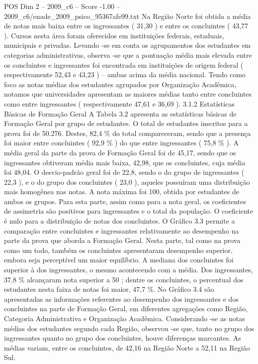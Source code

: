 \begin{textsample}{POS Dim 2 – 2009\_c6 – Score -1.00 – 2009\_c6/enade\_2009\_psico\_95367afe99.txt}
Na Região Norte foi obtida a média de notas mais baixa entre os ingressantes ( 31,30 ) e entre os concluintes ( 43,77 ).
Cursos nesta área foram oferecidos em instituições federais, estaduais, municipais e privadas.
Levando -se em conta os agrupamentos dos estudantes em categorias administrativas, observa -se que a pontuação média mais elevada entre os concluintes e ingressantes foi encontrada em instituições de origem federal ( respectivamente 52,43 e 43,23 ) – ambas acima da média nacional.
Tendo como foco as notas médias dos estudantes agrupados por Organização Acadêmica, notamos que universidades apresentam as maiores médias tanto entre concluintes como entre ingressantes ( respectivamente 47,61 e 36,69 ). 3.1.2 Estatísticas Básicas de Formação Geral A Tabela 3.2 apresenta as estatísticas básicas de Formação Geral por grupo de estudantes.
O total de estudantes inscritos para a prova foi de 50.276.
Destes, 82,4 \% do total compareceram, sendo que a presença foi maior entre concluintes ( 92,9 \% ) do que entre ingressantes ( 75,8 \% ).
A média geral da parte da prova de Formação Geral foi de 45,17, sendo que os ingressantes obtiveram média mais baixa, 42,98, que os concluintes, cuja média foi 48,04.
O desvio-padrão geral foi de 22,8, sendo o do grupo de ingressantes ( 22,3 ), e o do grupo dos concluintes ( 23,0 ), aqueles possuíram uma distribuição mais homogênea nas notas.
A nota máxima foi 100, obtida por estudantes de ambos os grupos.
Para esta parte, assim como para a nota geral, os coeficientes de assimetria são positivos para ingressantes e o total da população.
O coeficiente é nulo para a distribuição de notas dos concluintes.
O Gráfico 3.3 permite a comparação entre concluintes e ingressantes relativamente ao desempenho na parte da prova que aborda a Formação Geral.
Nesta parte, tal como na prova como um todo, também os concluintes apresentaram desempenho superior, embora seja perceptível um maior equilíbrio.
A mediana dos concluintes foi superior à dos ingressantes, o mesmo acontecendo com a média.
Dos ingressantes, 37,8 \% alcançaram nota superior a 50 ; dentre os concluintes, o percentual dos estudantes nesta faixa de notas foi maior, 47,7 \%.
No Gráfico 3.4 são apresentadas as informações referentes ao desempenho dos ingressantes e dos concluintes na parte de Formação Geral, em diferentes agregações como Região, Categoria Administrativa e Organização Acadêmica.
Considerando -se as notas médias dos estudantes segundo cada Região, observou -se que, tanto no grupo dos ingressantes quanto no grupo dos concluintes, houve diferenças marcantes.
As médias variam, entre os concluintes, de 42,16 na Região Norte a 52,11 na Região Sul.

\end{textsample}
